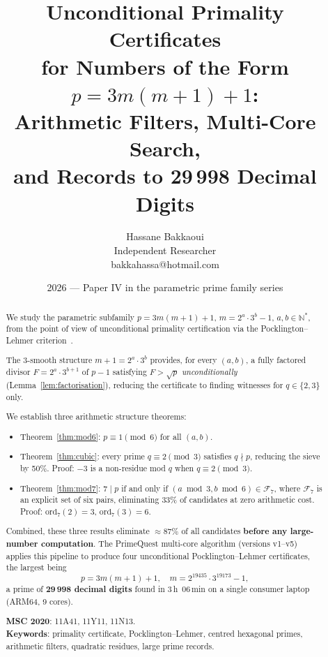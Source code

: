 \documentclass[11pt,a4paper]{article}
\title{\Large Unconditional Primality Certificates\\
for Numbers of the Form $p = 3m(m+1) + 1$:\\[3pt]
\large Arithmetic Filters, Multi-Core Search,\\
and Records to 29\,998 Decimal Digits}
\author{Hassane Bakkaoui\\\small Independent Researcher\\\small bakkahassa@hotmail.com}
\date{2026 --- Paper IV in the parametric prime family series}
\theoremstyle{plain}
\theoremstyle{definition}
\begin{document}
\maketitle

\begin{abstract}
We study the parametric subfamily $p = 3m(m+1) + 1$, $m = 2^a \cdot 3^b - 1$,
$a, b \in \mathbb{N}^*$, from the point of view of unconditional primality
certification via the Pocklington--Lehmer criterion~\cite{pock,brillhart}.

The 3-smooth structure $m+1 = 2^a \cdot 3^b$ provides, for every $(a, b)$, a
fully factored divisor $F = 2^a \cdot 3^{b+1}$ of $p-1$ satisfying
$F > \sqrt{p}$ \emph{unconditionally} (Lemma~\ref{lem:factorisation}), reducing
the certificate to finding witnesses for $q \in \{2, 3\}$ only.

We establish three arithmetic structure theorems:
\begin{itemize}[leftmargin=*]
\item Theorem~\ref{thm:mod6}: $p \equiv 1 \pmod{6}$ for all $(a, b)$.
\item Theorem~\ref{thm:cubic}: every prime $q \equiv 2 \pmod{3}$ satisfies
$q \nmid p$, reducing the sieve by 50\%. Proof: $-3$ is a non-residue mod $q$
when $q \equiv 2 \pmod{3}$.
\item Theorem~\ref{thm:mod7}: $7 \mid p$ if and only if
$(a \bmod 3, b \bmod 6) \in \mathcal{F}_7$, where $\mathcal{F}_7$ is an explicit
set of six pairs, eliminating 33\% of candidates at zero arithmetic cost.
Proof: $\mathrm{ord}_7(2) = 3$, $\mathrm{ord}_7(3) = 6$.
\end{itemize}

Combined, these three results eliminate $\approx 87\%$ of all candidates
\textbf{before any large-number computation}. The PrimeQuest multi-core
algorithm (versions v1--v5) applies this pipeline to produce four unconditional
Pocklington--Lehmer certificates, the largest being
\[
p = 3m(m+1) + 1, \quad m = 2^{19435} \cdot 3^{19173} - 1,
\]
a prime of \textbf{29\,998 decimal digits} found in 3\,h~06\,min on a single
consumer laptop (ARM64, 9 cores).

\smallskip
\textbf{MSC 2020}: 11A41, 11Y11, 11N13.\\
\textbf{Keywords}: primality certificate, Pocklington--Lehmer, centred
hexagonal primes, arithmetic filters, quadratic residues, large prime records.
\end{abstract}

\tableofcontents
\end{document}
